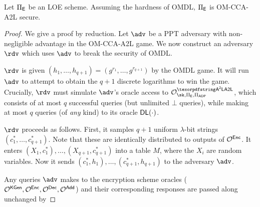 \begin{lemma}\label{lem:loe-omcca}
    Let $\Pi_{\mathsf{E}}$ be an LOE scheme. Assuming the hardness of OMDL, $\Pi_{\mathsf{E}}$ is OM-CCA-A2L secure.
\end{lemma}
\begin{proof}
    We give a proof by reduction. Let $\adv$ be a PPT adversary with non-negligible advantage in the OM-CCA-A2L game. We now construct an adversary $\rdv$ which uses $\adv$ to break the security of OMDL.
    
    $\rdv$ is given $(h_1, \ldots, h_{q+1}) = (g^{r_1}, \ldots, g^{r_{q+1}})$ by the OMDL game. It will run $\adv$ to attempt to obtain the $q+1$ discrete logarithms to win the game. Crucially, $\rdv$ must simulate $\adv$'s oracle access to $\oracle^{\AAL}_{\sk,\Pi_\ENC,\Pi_\ADP}$, which consists of at most $q$ successful queries (but unlimited $\bot$ queries), while making at most $q$ queries (of \emph{any} kind) to its oracle ${\mathsf{DL}}(\cdot)$.
    
    $\rdv$ proceeds as follows. First, it samples $q+1$ uniform $\lambda$-bit strings $(c_1^*, \ldots,\allowbreak c_{q+1}^*)$. Note that these are identically distributed to outputs of $\mathcal{O}^{{\mathsf{Enc}}}$. It enters $(X_1, c_1^*), \ldots, (X_{q+1},c_{q+1}^*)$ into a table $M$, where the $X_i$ are random variables. Now it sends $(c_1^*,h_1), \ldots, (c_{q+1}^*,h_{q+1})$ to the adversary $\adv$.
    
    Any queries $\adv$ makes to the encryption scheme oracles ($\mathcal{O}^{{\mathsf{KGen}}},\\ \mathcal{O}^{{\mathsf{Enc}}},\mathcal{O}^{{\mathsf{Dec}}}, \mathcal{O}^{{\mathsf{Add}}}$) and their corresponding responses are passed along unchanged by %
    

\end{proof}
